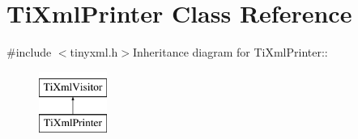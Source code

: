 \hypertarget{class_ti_xml_printer}{
\section{TiXmlPrinter Class Reference}
\label{class_ti_xml_printer}
}


{\ttfamily \#include $<$tinyxml.h$>$}Inheritance diagram for TiXmlPrinter::\begin{figure}[H]
\begin{center}
\leavevmode
\includegraphics[height=2cm]{class_ti_xml_printer}
\end{center}
\end{figure}
